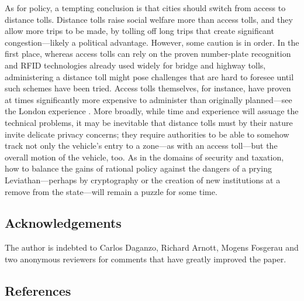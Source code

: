 \documentclass[preprint,authoryear]{elsarticle}
\begin{document}
As for policy, a tempting conclusion is that cities should switch from access to distance tolls. Distance tolls raise social welfare more than access tolls, and they allow more trips to be made, by tolling off long trips that create significant congestion---likely a political advantage. However, some caution is in order. In the first place, whereas access tolls can rely on the proven number-plate recognition and RFID technologies already used widely for bridge and highway tolls, administering a distance toll might pose challenges that are hard to foresee until such schemes have been tried. Access tolls themselves, for instance, have proven at times significantly more expensive to administer than originally planned---see the London experience \citep{santos2008}. More broadly, while time and experience will assuage the technical problems, it may be inevitable that distance tolls must by their nature invite delicate privacy concerns; they require authorities to be able to somehow track not only the vehicle's entry to a zone---as with an access toll---but the overall motion of the vehicle, too. As in the domains of security and taxation, how to balance the gains of rational policy against the dangers of a prying Leviathan---perhaps by cryptography or the creation of new institutions at a remove from the state---will remain a puzzle for some time.

\subsection*{Acknowledgements}

The author is indebted to Carlos Daganzo, Richard Arnott, Mogens Fosgerau and two anonymous reviewers for comments that have greatly improved the paper.

\pagebreak
\subsection*{References}


\end{document}
